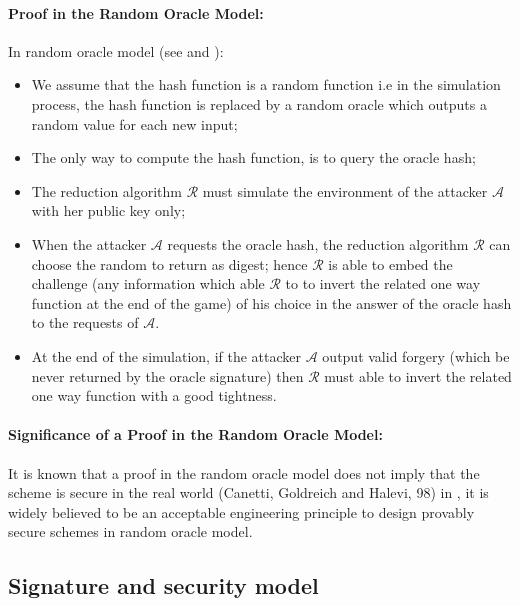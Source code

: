 \documentclass[a4paper,11pt]{article}
\begin{document}
\vspace{0.2cm}

\paragraph{Proof in the Random Oracle Model:}

In random oracle model (see \cite{Bellare1} and \cite{Canetti}):
\begin{itemize}
\item We assume that the hash function is a random function i.e in the simulation process, the hash function is replaced by a random oracle which outputs a random value for each new input;
\item The only way to compute the hash function, is to query the oracle hash;
\item The reduction algorithm $\mathcal{R}$ must simulate the  environment of the attacker $\mathcal{A}$ with her public key only;
\item  When the attacker $\mathcal{A}$ requests the oracle hash,
 the reduction algorithm $\mathcal{R}$ can choose the random to return as digest; hence $\mathcal{R}$
is able to embed the challenge (any information which able $\mathcal{R}$ to to invert the related one way function at the end of the game)   of his choice in the answer of the oracle hash to the requests of  $\mathcal{A}$.
\item  At the end of the simulation, if the attacker $\mathcal{A}$ output valid
 forgery (which be never returned by the oracle signature) then $\mathcal{R}$
 must able to invert the related one way function with a good tightness.
\end{itemize}

\vspace{0.2cm}

\paragraph{Significance of a Proof in the Random Oracle Model:}

It is known that a proof in the random oracle model does not imply that the scheme is secure in the real
world (Canetti, Goldreich and Halevi,  98) in \cite{Canetti}, it is  widely believed to be an acceptable engineering principle to design provably secure schemes in random oracle model.

\subsection{Signature and security model}\label{sec:one:2}
\end{document}
